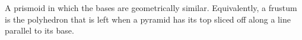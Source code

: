A prismoid in which the bases are geometrically
similar. Equivalently, a frustum is the polyhedron that is left when a
pyramid has its top sliced off along a line parallel to its base.